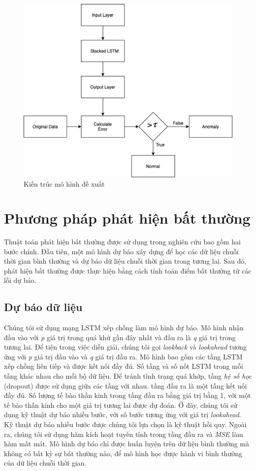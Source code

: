 \begin{figure}[H]
    \centering
    \includegraphics[scale=1.27]{./content/images/4-12.png}
    \caption{Kiến trúc mô hình đề xuất}
    \label{fig:4-12}
\end{figure}

\section{Phương pháp phát hiện bất thường}
Thuật toán phát hiện bất thường được sử dụng trong nghiên cứu bao gồm hai bước chính. Đầu tiên, một mô hình dự báo xây dựng để học các dữ liệu chuỗi thời gian bình thường và dự báo dữ liệu chuỗi thời gian trong tương lai. Sau đó, phát hiện bất thường được thực hiện bằng cách tính toán điểm bất thường từ các lỗi dự báo.

\subsection{Dự báo dữ liệu}
Chúng tôi sử dụng mạng LSTM xếp chồng làm mô hình dự báo. Mô hình nhận đầu vào với \textit{p} giá trị trong quá khứ gần đây nhất và đầu ra là \textit{q} giá trị trong tương lai. Để tiện trong việc diễn giải, chúng tôi gọi \textit{lookback} và \textit{lookahead} tương ứng với \textit{p} giá trị đầu vào và \textit{q} giá trị đầu ra. Mô hình bao gồm các tầng LSTM xếp chồng liên tiếp và được kết nối đầy đủ. Số tầng và số nốt LSTM trong mỗi tầng khác nhau cho mỗi bộ dữ liệu. Để tránh tình trạng quá khớp, tầng \textit{hệ số học} (dropout) được sử dụng giữa các tầng với nhau. tầng đầu ra là một tầng kết nối đầy đủ. Số lượng tế bào thần kinh trong tầng đầu ra bằng giá trị bằng 1, với một tế bào thần kinh cho một giá trị tương lai được dự đoán. Ở đây, chúng tôi sử dụng kỹ thuật dự báo nhiều bước, với số bước tương ứng với giá trị \textit{lookahead}. Kỹ thuật dự báo nhiều bước được chúng tôi lựa chọn là kỹ thuật hồi quy. Ngoài ra, chúng tôi sử dụng hàm kích hoạt tuyến tính trong tầng đầu ra và \textit{MSE} làm hàm mất mát. Mô hình dự báo chỉ được huấn luyện trên dữ liệu bình thường mà không có bất kỳ sự bất thường nào, để mô hình học được hành vi bình thường của dữ liệu chuỗi thời gian.

